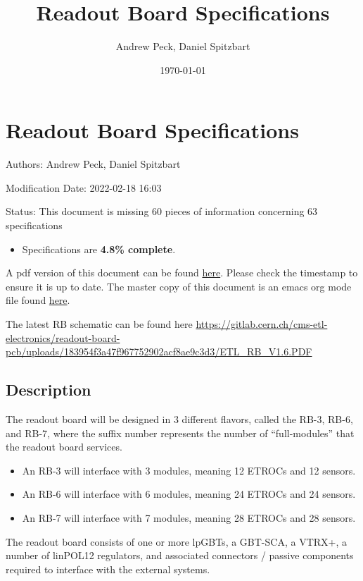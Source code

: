 \documentclass[11pt]{article}
\author{Andrew Peck, Daniel Spitzbart}
\date{\today}
\title{Readout Board Specifications}
\begin{document}
\maketitle

\section{Readout Board Specifications}
\label{sec:orgef1a09f}

Authors: Andrew Peck, Daniel Spitzbart

Modification Date: 2022-02-18 16:03

Status: This document is missing 60 pieces of information concerning  63 specifications
\begin{itemize}
\item Specifications are \textbf{4.8\% complete}.
\end{itemize}

A pdf version of this document can be found \href{./rb-specs.pdf}{here}. Please check the timestamp to ensure it is up to date. The master copy of this document is an emacs org mode file found \href{https://gitlab.cern.ch/cms-etl-electronics/readout-board-docs/-/blob/master/docs/Specifications/rb-specs.org}{here}.

The latest RB schematic can be found here \url{https://gitlab.cern.ch/cms-etl-electronics/readout-board-pcb/uploads/183954f3a47f967752902acf8ae9c3d3/ETL\_RB\_V1.6.PDF}

\setcounter{tocdepth}{3}
\tableofcontents

\subsection{Description}
\label{sec:orge9e066a}

The readout board will be designed in 3 different flavors, called the RB-3, RB-6, and RB-7, where the suffix number represents the number of ``full-modules'' that the readout board services.

\begin{itemize}
\item An RB-3 will interface with 3 modules, meaning 12 ETROCs and 12 sensors.
\item An RB-6 will interface with 6 modules, meaning 24 ETROCs and 24 sensors.
\item An RB-7 will interface with 7 modules, meaning 28 ETROCs and 28 sensors.
\end{itemize}

The readout board consists of one or more lpGBTs, a GBT-SCA, a VTRX+, a number of linPOL12 regulators, and associated connectors / passive components required to interface with the external systems.
\end{document}
